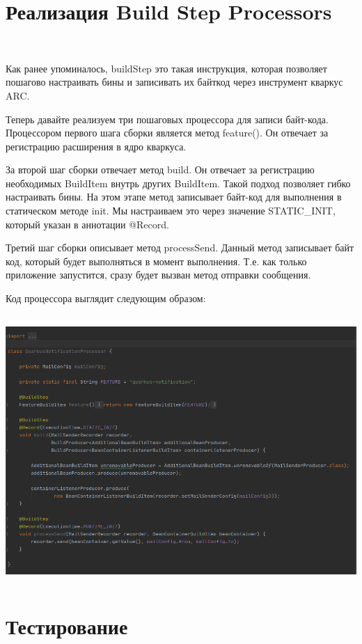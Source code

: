 \documentclass[russian,11pt]{article}
\begin{document}
\section{Реализация Build Step Processors}
~

Как ранее упоминалось, buildStep это такая инструкция, которая позволяет пошагово настраивать бины и записивать их байткод через инструмент кваркус ARC.

	Теперь давайте реализуем три пошаговых процессора для записи байт-кода. 
Процессором первого шага сборки является метод feature(). Он отвечает за регистрацию расширения в ядро кваркуса.

	За второй шаг сборки отвечает метод build. Он отвечает за регистрацию необходимых BuildItem внутрь других BuildItem. Такой подход позволяет гибко настраивать бины. На этом этапе метод записывает байт-код для выполнения в статическом методе init. Мы настраиваем это через значение STATIC\_INIT, который указан в аннотации @Record.

	Третий шаг сборки описывает метод processSend. Данный метод записывает байт код, который будет выполняться в момент выполнения. Т.е. как только приложение запустится, сразу будет вызван метод отправки сообщения. 


Код процессора выглядит следующим образом:

\paragraph{\includegraphics[width=\textwidth, height=10cm]{10}}

\newpage
\section{Тестирование}
\end{document}
